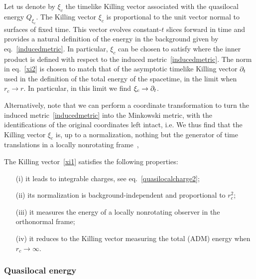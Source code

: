 \documentclass[11pt,a4paper,utf8]{article}
\begin{document}
	Let us denote by $\xi_c$ the timelike Killing vector associated with the quasilocal energy $Q_{\xi_c}$. The Killing vector $\xi_c$ is proportional to the unit vector normal to surfaces of fixed time. This vector evolves constant-$t$ slices forward in time and provides a natural definition of the energy in the background given by eq.~\eqref{inducedmetric}. In particular, $\xi_c$ can be chosen to satisfy 
	where the inner product is defined with respect to the induced metric~\eqref{inducedmetric}. The norm in eq.~\eqref{xi2} is chosen to match that of the asymptotic timelike Killing vector $\partial_t$ used in the definition of the total energy of the spacetime, in the limit when $r_c \to r$. In particular, in this limit we find $\xi_c \to \partial_t$.
	
	Alternatively, note that we can perform a coordinate transformation 
	to turn the induced metric~\eqref{inducedmetric} into the Minkowski metric,
	with the identifications of the original coordinates left intact, i.e.
	We thus find that the Killing vector $\xi_c$ is, up to a normalization, nothing but the generator of time translations in a locally nonrotating frame~\cite{Misner:1974qy},
	
	The Killing vector~\eqref{xi1} satisfies the following properties:
	 \begin{enumerate}
	 \item[(i)] it leads to integrable charges, see eq.~\eqref{quasilocalcharge2};
	 \item[(ii)] its normalization is background-independent and proportional to $r_c^2$;
	 \item[(iii)] it measures the energy of a locally nonrotating observer in the orthonormal frame;
	 \item[(iv)] it reduces to the Killing vector measuring the total (ADM) energy when $r_c \to \infty$.
	 \end{enumerate}
	
\subsubsection*{Quasilocal energy}
	
\end{document}
